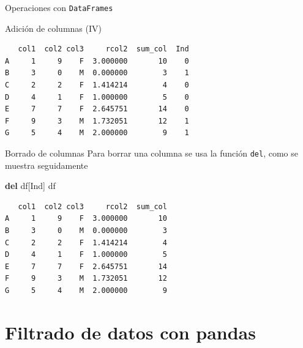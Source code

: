 \documentclass[
  ignorenonframetext,
  aspectratio=169,
  spanish,
]{beamer}
\newenvironment{Shaded}{\begin{snugshade}}{\end{snugshade}}
\newcommand{\KeywordTok}[1]{\textcolor[rgb]{0.00,0.23,0.31}{\textbf{#1}}}
\newcommand{\NormalTok}[1]{\textcolor[rgb]{0.00,0.23,0.31}{#1}}
\newcommand{\StringTok}[1]{\textcolor[rgb]{0.13,0.47,0.30}{#1}}
\begin{document}
\begin{frame}[fragile]{Operaciones con \texttt{DataFrames}}
\begin{block}{Adición de columnas (IV)}
\begin{verbatim}
   col1  col2 col3     rcol2  sum_col  Ind
A     1     9    F  3.000000       10    0
B     3     0    M  0.000000        3    1
C     2     2    F  1.414214        4    0
D     4     1    F  1.000000        5    0
E     7     7    F  2.645751       14    0
F     9     3    M  1.732051       12    1
G     5     4    M  2.000000        9    1
\end{verbatim}
\end{block}

\begin{block}{Borrado de columnas}
\label{borrado-de-columnas}
Para borrar una columna se usa la función \texttt{del}, como se muestra
seguidamente

\begin{Shaded}
\begin{Highlighting}[]
\KeywordTok{del}\NormalTok{ df[}\StringTok{\textquotesingle{}Ind\textquotesingle{}}\NormalTok{]}
\NormalTok{df }
\end{Highlighting}
\end{Shaded}

\begin{verbatim}
   col1  col2 col3     rcol2  sum_col
A     1     9    F  3.000000       10
B     3     0    M  0.000000        3
C     2     2    F  1.414214        4
D     4     1    F  1.000000        5
E     7     7    F  2.645751       14
F     9     3    M  1.732051       12
G     5     4    M  2.000000        9
\end{verbatim}
\end{block}
\end{frame}

\section{Filtrado de datos con
pandas}\label{filtrado-de-datos-con-pandas}
\end{document}
